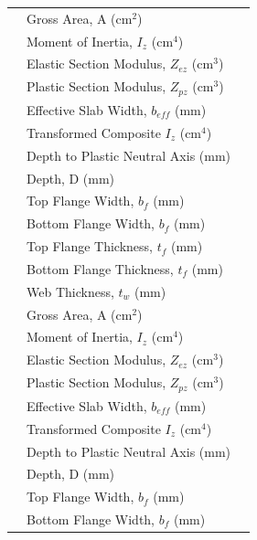 \documentclass[12pt,a4paper]{report}
\numberwithin{table}{chapter}
\numberwithin{figure}{chapter}
\begin{document}
\begin{longtable}{|C{2.5cm}|L{8.0cm}|>{\centering\arraybackslash}p{5.0cm}|}
 & \textnormal{Gross Area, A (cm$^2$)} &  \\[6pt]
 & \textnormal{Moment of Inertia, $I_z$ (cm$^4$)} &  \\[6pt]
 & \textnormal{Elastic Section Modulus, $Z_{ez}$ (cm$^3$)} &  \\[6pt]
 & \textnormal{Plastic Section Modulus, $Z_{pz}$ (cm$^3$)} &  \\[6pt]
 & \textnormal{Effective Slab Width, $b_{eff}$ (mm)} &  \\[6pt]
 & \textnormal{Transformed Composite $I_z$ (cm$^4$)} &  \\[6pt]
 & \textnormal{Depth to Plastic Neutral Axis (mm)} &  \\[6pt]
\hline
{} & \textnormal{Depth, D (mm)} &  \\[6pt]
 & \textnormal{Top Flange Width, $b_f$ (mm)} &  \\[6pt]
 & \textnormal{Bottom Flange Width, $b_f$ (mm)} &  \\[6pt]
 & \textnormal{Top Flange Thickness, $t_f$ (mm)} &  \\[6pt]
 & \textnormal{Bottom Flange Thickness, $t_f$ (mm)} &  \\[6pt]
 & \textnormal{Web Thickness, $t_w$ (mm)} &  \\[6pt]
 & \textnormal{Gross Area, A (cm$^2$)} &  \\[6pt]
 & \textnormal{Moment of Inertia, $I_z$ (cm$^4$)} &  \\[6pt]
 & \textnormal{Elastic Section Modulus, $Z_{ez}$ (cm$^3$)} &  \\[6pt]
 & \textnormal{Plastic Section Modulus, $Z_{pz}$ (cm$^3$)} &  \\[6pt]
 & \textnormal{Effective Slab Width, $b_{eff}$ (mm)} &  \\[6pt]
 & \textnormal{Transformed Composite $I_z$ (cm$^4$)} &  \\[6pt]
 & \textnormal{Depth to Plastic Neutral Axis (mm)} &  \\[6pt]
\hline
{} & \textnormal{Depth, D (mm)} &  \\[6pt]
 & \textnormal{Top Flange Width, $b_f$ (mm)} &  \\[6pt]
 & \textnormal{Bottom Flange Width, $b_f$ (mm)} &  \\[6pt]

\end{longtable}
\end{document}
